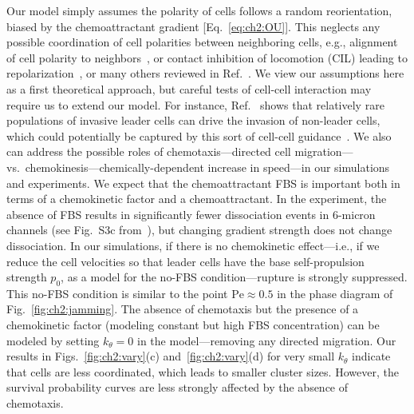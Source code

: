 Our model simply assumes the polarity of cells follows a random reorientation, biased by the chemoattractant gradient [Eq.~\eqref{eq:ch2:OU}].
This neglects any possible coordination of cell polarities between neighboring cells, e.g., alignment of cell polarity to neighbors~\cite{vicsek1995novel}, or contact inhibition of locomotion (CIL) leading to repolarization~\cite{camley2014polarity, kulawiak2016modeling, wang2024limits}, or many others reviewed in Ref.~\cite{camley2017physical}.
We view our assumptions here as a first theoretical approach, but careful tests of cell-cell interaction may require us to extend our model.
For instance, Ref.~\cite{leggett2024relatively} shows that relatively rare populations of invasive leader cells can drive the invasion of non-leader cells, which could potentially be captured by this sort of cell-cell guidance~\cite{kabla2012collective, tarle2017modeling}.
We also can address the possible roles of chemotaxis---directed cell migration---vs.\ chemokinesis---chemically-dependent increase in speed---in our simulations and experiments.
We expect that the chemoattractant FBS is important both in terms of a chemokinetic factor and a chemoattractant.
In the experiment, the absence of FBS results in significantly fewer dissociation events in $6$-micron channels (see Fig.~S3c from~\cite{law2023cytokinesis}), but changing gradient strength does not change dissociation.
In our simulations, if there is no chemokinetic effect---i.e., if we reduce the cell velocities so that leader cells have the base self-propulsion strength $p_0$, as a model for the no-FBS condition---rupture is strongly suppressed.
This no-FBS condition is similar to the point $\textrm{Pe}\approx 0.5$ in the phase diagram of Fig.~\ref{fig:ch2:jamming}.
The absence of chemotaxis but the presence of a chemokinetic factor (modeling constant but high FBS concentration) can be modeled by setting $k_\theta = 0$ in the model---removing any directed migration.
Our results in Figs.~\ref{fig:ch2:vary}(c) and~\ref{fig:ch2:vary}(d) for very small $k_\theta$ indicate that cells are less coordinated, which leads to smaller cluster sizes.
However, the survival probability curves are less strongly affected by the absence of chemotaxis.

